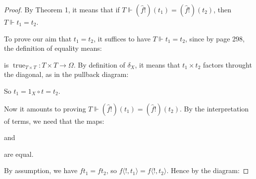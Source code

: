 \documentclass[a4paper]{article}
\DeclareMathOperator{\ev}{\text {ev}}
\DeclareMathOperator{\true}{\text {true}}
\begin{document}
\begin{proof}
    By Theorem 1, it means that if $T\Vdash (\hat{f}!)(t_1)=(\hat{f}!)(t_2)$, then $T\Vdash t_1=t_2$. 

    To prove our aim that $t_1=t_2$, it suffices to have $T\Vdash t_1=t_2$, since by page 298, the definition of equality means:
    \begin{center}
    \end{center}

    is $\true_{T\times T}:T\times T\to \Omega$. By definition of $\delta_X$, it means that $ t_1\times t_2$ factors throught the diagonal, as in the pullback diagram:

    \begin{center}
    \end{center}

    So $t_1=1_X\circ t = t_2$. 

    Now it amounts to proving $T\Vdash (\hat{f}!)(t_1)=(\hat{f}!)(t_2)$. By the interpretation of terms, we need that the maps:
    \begin{center}
    \end{center}

    and 
    \begin{center}
    \end{center}

    are equal.

    By assumption, we have $ft_1=ft_2$, so $f\langle !,t_1\rangle = f\langle !,t_2\rangle$. Hence by the diagram:


\end{proof}
\end{document}
